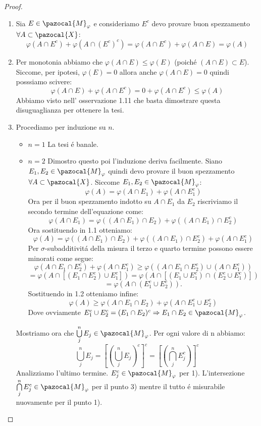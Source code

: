 \documentclass[11pt,a4paper]{report}
\theoremstyle{plain}
\theoremstyle{definition}
\newcommand{\M}{\pazocal{M}_\varphi}
\newcommand{\X}{\pazocal{X}}
\begin{document}
\begin{proof}
\begin{enumerate}
	\item Sia $E \in \M$ e consideriamo $E^c$ devo provare buon spezzamento $\forall A \subset \pazocal{X}$:
		\[
			\varphi(A \cap E^c) + \varphi(A \cap (E^c)^c) = \varphi(A \cap E^c) + \varphi(A \cap E) = \varphi(A) 
		\]
	\item Per monotonia abbiamo che $\varphi(A \cap E) \le \varphi(E)$ (poich\'e $(A \cap E) \subset E$). Siccome, per ipotesi, $\varphi(E)=0$ allora anche $\varphi(A \cap E)=0$ quindi posssiamo scivere:
	\[
		\varphi(A \cap E) +  \varphi(A \cap E^c)  = 0 + \varphi(A \cap E^c) \le \varphi(A)
	\]
Abbiamo visto nell' osservazione 1.11 che basta dimostrare questa disuguaglianza per ottenere la tesi.
	\item Procediamo per induzione su $n$.
	\begin{itemize}
		\item \textbf{$n=1$} La tesi \'e banale.
		\item \textbf{$n=2$} Dimostro questo poi l'induzione deriva facilmente. Siano $E_1, E_2 \in \M$ quindi devo provare il buon spezzamento $\forall A \subset \X$.
	Siccome $E_1,E_2 \in \M$:
	\begin{equation}
		\varphi(A) = \varphi(A \cap E_1) + \varphi(A \cap E_1^c)
	\end{equation}
	Ora per il buon spezzamento indotto su $A \cap E_1$  da $E_2$ riscriviamo il secondo termine dell'equazione come:
	\[
		\varphi(A \cap E_1) = \varphi((A \cap E_1) \cap E_2) + \varphi((A \cap E_1) \cap E_2^c)
	\]
	Ora sostituendo in 1.1 otteniamo:
	\begin{equation}
		\varphi(A) = \varphi((A \cap E_1) \cap E_2) + \varphi((A \cap E_1) \cap E_2^c) + \varphi(A \cap E_1^c)
	\end{equation}
	Per $\sigma$-subadditivit\'a della misura il terzo e quarto termine possono essere minorati come segue:
	\[
		\varphi(A \cap E_1 \cap E_2^c) + \varphi(A \cap E_1^c) \ge \varphi((A \cap E_1 \cap E_2^c) \cup (A \cap E_1^c))
	\]
	\[
		= \varphi(A \cap [(E_1 \cap E_2^c) \cup E_1^c]) =  \varphi(A \cap [(E_1 \cup E_1^c) \cap (E_2^c \cup E_1^c)])
	\]
	\[
		= \varphi(A \cap (E_1^c \cup E_2^c)).
	\]
	Sostituendo in 1.2 otteniamo infine:
	\begin{equation}
		\varphi(A) \ge \varphi(A \cap E_1 \cap E_2) + \varphi(A \cap E_1^c \cup E_2^c)
	\end{equation}
	Dove ovviamente $E_1^c \cup E_2^c = (E_1 \cap E_2)^c \Rightarrow E_1 \cap E_2 \in \M$. 
	\end{itemize}
	Mostriamo ora che $\bigcup\limits_{j}^nE_j \in \M$.
	Per ogni valore di n abbiamo:
	\[
		\bigcup\limits_{j}^nE_j = [(\bigcup\limits_{j}^nE_j)^c]^c = [(\bigcap\limits_{j}^nE_j^c)]^c
	\]
	Analizziamo l'ultimo termine. $E_j^c \in \M$ per 1). L'intersezione $\bigcap\limits_{j}^nE_j^c \in \M$ per il punto 3) mentre il tutto \'e misurabile nuovamente per il punto 1).


\end{enumerate}
\end{proof}
\end{document}
